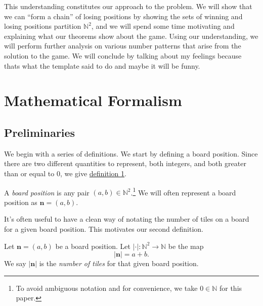 \documentclass[11pt, letterpaper]{article}
\begin{document}
This understanding constitutes our approach to the problem. We will show that we can ``form a chain'' of losing positions by showing the sets of winning and losing positions partition $\mathbb{N}^2$, and we will spend some time motivating and explaining what our theorems show about the game. Using our understanding, we will perform further analysis on various number patterns that arise from the solution to the game. We will conclude by talking about my feelings because thats what the template said to do and maybe it will be funny.









\section{Mathematical Formalism}\label{sec:2}
\subsection{Preliminaries}\label{sec:21}
We begin with a series of definitions. We start by defining a board position. Since there are two different quantities to represent, both integers, and both greater than or equal to 0, we give \hyperref[dfn:1]{definition 1}.
\begin{definition}\label{dfn:1}
	A \emph{board position} is any pair $(a,b)\in\mathbb{N}^2$.\footnote{To avoid ambiguous notation and for convenience, we take $0\in\mathbb{N}$ for this paper.} We will often represent a board position as $\mathbf{n}=(a,b)$.
\end{definition}

It's often useful to have a clean way of notating the number of tiles on a board for a given board position. This motivates our second definition.
\begin{definition}\label{dfn:2}
	Let $\mathbf{n}=(a,b)$ be a board position. Let $\left| \cdot  \right| : \mathbb{N}^2 \to \mathbb{N}$ be the map
	\[
		\left| \mathbf{n} \right| =a+b
	.\]
	We say $\left| \mathbf{n} \right| $ is the \emph{number of tiles} for that given board position.
\end{definition}
\end{document}
